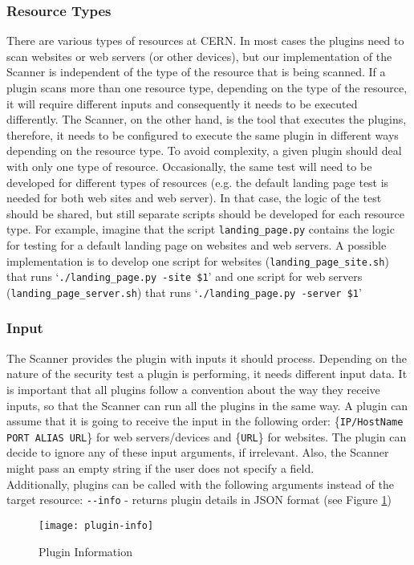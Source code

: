 \subsubsection{Resource Types}
There are various types of resources at CERN. In most cases the plugins need to scan websites or web servers (or other devices), but our implementation of the Scanner is independent of the type of the resource that is being scanned. If a plugin scans more than one resource type, depending on the type of the resource, it will require different inputs and consequently it needs to be executed differently. The Scanner, on the other hand, is the tool that executes the plugins, therefore, it needs to be configured to execute the same plugin in different ways depending on the resource type. To avoid complexity, a given plugin should deal with only one type of resource. Occasionally, the same test will need to be developed for different types of resources (e.g. the default landing page test is needed for both web sites and web server). In that case, the logic of the test should be shared, but still separate scripts should be developed for each resource type. For example, imagine that the script \texttt{landing\_page.py} contains the logic for testing for a default landing page on websites and web servers. A possible implementation is to develop one script for websites (\texttt{landing\_page\_site.sh}) that runs `\texttt{./landing\_page.py -site \$1}' and one script for web servers (\texttt{landing\_page\_server.sh}) that runs `\texttt{./landing\_page.py -server \$1}' 
\subsubsection{Input}
The Scanner provides the plugin with inputs it should process. Depending on the nature of the security test a plugin is performing, it needs different input data. It is important that all plugins follow a convention about the way they receive inputs, so that the Scanner can run all the plugins in the same way. A plugin can assume that it is going to receive the input in the following order: \{\texttt{IP/HostName PORT ALIAS URL}\} for web servers/devices and \{\texttt{URL}\} for websites. The plugin can decide to ignore any of these input arguments, if irrelevant. Also, the Scanner might pass an empty string if the user does not specify a field.
\\
Additionally, plugins can be called with the following arguments instead of the target resource:
\texttt{-{}-info} - returns plugin details in JSON format (see Figure \ref{figure:plugin-info})  
\begin{figure}[h!]

  \centering
    \texttt{[image: plugin-info]}
  \caption{Plugin Information}
\label{figure:plugin-info}
  
\end{figure}
